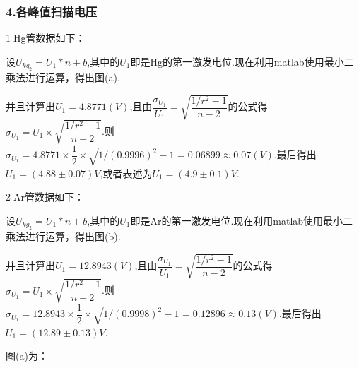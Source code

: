 \documentclass[12pt,a4paper,UTF8]{ctexart}
\begin{document}
\subsubsection*{4.各峰值扫描电压}
\textcircled{1}Hg管数据如下：
\begin{table}[htbp]
\centering
{}
\end{table}
\par
设$U_{kg_2}=U_1*n+b$,其中的$U_1$即是Hg的第一激发电位.现在利用matlab使用最小二乘法进行运算，得出图(a).
\par
并且计算出$U_1=4.8771(V)$,且由$\dfrac{\sigma_{U_1}}{U_1}=\sqrt{\dfrac{1/r^2-1}{n-2}}$的公式得$\sigma_{U_1}=U_1\times \sqrt{\dfrac{1/r^2-1}{n-2}} $.则$\sigma_{U_1}=4.8771\times \dfrac{1}{2}\times \sqrt{1/(0.9996)^2-1}=0.06899\approx0.07(V)$,最后得出$U_1=(4.88\pm0.07)V$,或者表述为$U_1=(4.9\pm0.1)V$.
\par
\textcircled{2}Ar管数据如下：
\begin{table}[htbp]
\centering
{}
\end{table}
\par
设$U_{kg_2}=U_1*n+b$,其中的$U_1$即是Ar的第一激发电位.现在利用matlab使用最小二乘法进行运算，得出图(b).
\par
并且计算出$U_1=12.8943(V)$,且由$\dfrac{\sigma_{U_1}}{U_1}=\sqrt{\dfrac{1/r^2-1}{n-2}}$的公式得$\sigma_{U_1}=U_1\times \sqrt{\dfrac{1/r^2-1}{n-2}} $.则$\sigma_{U_1}=12.8943\times \dfrac{1}{2}\times \sqrt{1/(0.9998)^2-1}=0.12896\approx0.13(V)$,最后得出$U_1=(12.89\pm0.13)V$.\par
图(a)为：
\begin{figure}[htbp]
	\end{figure}
\end{document}
